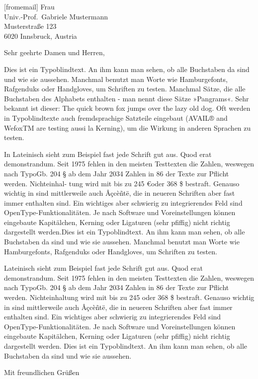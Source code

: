 \documentclass[ngerman,noconfig]{uibklttr}
\begin{document}
\begin{letter}[fromemail]{%
  Frau\\
  Univ.-Prof.~Gabriele Mustermann\\
  Musterstraße 123\\
  6020 Innsbruck, Austria}

\opening{Sehr geehrte Damen und Herren,}

Dies ist ein Typoblindtext. An ihm kann man sehen, ob alle Buchstaben da sind
und wie sie aussehen. Manchmal benutzt man Worte wie Hamburgefonts, Rafgenduks
oder Handgloves, um Schriften zu testen. Manchmal Sätze, die alle Buchstaben des
Alphabets enthalten - man nennt diese Sätze »Pangrams«. Sehr bekannt ist dieser:
The quick brown fox jumps over the lazy old dog. Oft werden in Typoblindtexte
auch fremdsprachige Satzteile eingebaut (AVAIL® and WefoxTM are testing aussi la
Kerning), um die Wirkung in anderen Sprachen zu testen.

In Lateinisch sieht zum Beispiel fast jede Schrift gut aus. Quod erat
demonstrandum. Seit 1975 fehlen in den meisten Testtexten die Zahlen, weswegen
nach TypoGb. 204 § ab dem Jahr 2034 Zahlen in 86 der Texte zur Pflicht werden.
Nichteinhal- tung wird mit bis zu 245 €oder 368 \$ bestraft. Genauso wichtig in
sind mittlerweile auch Âçcèñtë, die in neueren Schriften aber fast immer
enthalten sind. Ein wichtiges aber schwierig zu integrierendes Feld sind
OpenType-Funktionalitäten. Je nach Software und Voreinstellungen können
eingebaute Kapitälchen, Kerning oder Ligaturen (sehr pfiffig) nicht richtig
dargestellt werden.Dies ist ein Typoblindtext. An ihm kann man sehen, ob alle
Buchstaben da sind und wie sie aussehen.  Manchmal benutzt man Worte wie
Hamburgefonts, Rafgenduks oder Handgloves, um Schriften zu testen.

Lateinisch sieht zum Beispiel fast jede Schrift gut aus. Quod erat
demonstrandum. Seit 1975 fehlen in den meisten Testtexten die Zahlen, weswegen
nach TypoGb. 204 § ab dem Jahr 2034 Zahlen in 86 der Texte zur Pflicht werden.
Nichteinhaltung wird mit bis zu 245 oder 368 \$ bestraft. Genauso wichtig in
sind mittlerweile auch Âçcèñtë, die in neueren Schriften aber fast immer
enthalten sind. Ein wichtiges aber schwierig zu integrierendes Feld sind
OpenType-Funktionalitäten. Je nach Software und Voreinstellungen können
eingebaute Kapitälchen, Kerning oder Ligaturen (sehr pfiffig) nicht richtig
dargestellt werden. Dies ist ein Typoblindtext. An ihm kann man sehen, ob alle
Buchstaben da sind und wie sie aussehen.

\closing{Mit freundlichen Grüßen}


\end{letter}
\end{document}
